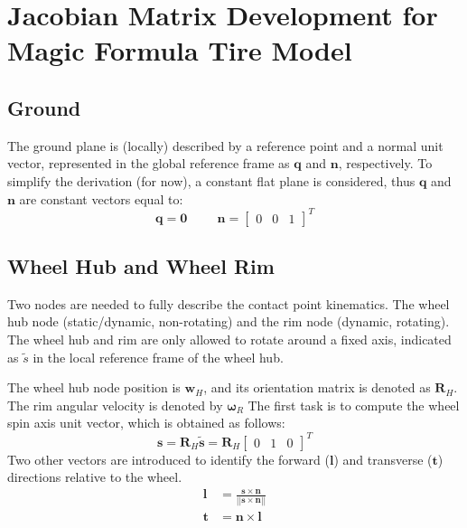 \section{Jacobian Matrix Development for Magic Formula Tire Model}

\subsection{Ground}

The ground plane is (locally) described by a reference point and a normal unit vector, represented in the global reference frame as $\mathbf{q}$ and $\mathbf{n}$, respectively. To simplify the derivation (for now), a constant flat plane is considered, thus $\mathbf{q}$ and $\mathbf{n}$ are constant vectors equal to:
\begin{equation}
    \label{eq:assumptions}
    \mathbf{q} = \mathbf{0}\hspace{1cm}\mathbf{n} = \begin{bmatrix}
        0 & 0 & 1
    \end{bmatrix}^T
\end{equation}

\subsection{Wheel Hub and Wheel Rim}

Two nodes are needed to fully describe the contact point kinematics. The wheel hub node (static/dynamic, non-rotating) and the rim node (dynamic, rotating). The wheel hub and rim are only allowed to rotate around a fixed axis, indicated as $\tilde{s}$ in the local reference frame of the wheel hub.

The wheel hub node position is $\mathbf{w}_H$, and its orientation matrix is denoted as $\mathbf{R}_H$. The rim angular velocity is denoted by $\boldsymbol{\omega}_R$
The first task is to compute the wheel spin axis unit vector, which is obtained as follows:
\begin{equation}
    \mathbf{s} = \mathbf{R}_H \tilde{\mathbf{s}} = \mathbf{R}_H \begin{bmatrix}
        0 & 1 & 0
    \end{bmatrix}^T
\end{equation}
Two other vectors are introduced to identify the forward ($\mathbf{l}$) and transverse ($\mathbf{t}$) directions relative to the wheel.
\begin{equation}
    \begin{split}
        \mathbf{l} &= \frac{\mathbf{s} \times \mathbf{n}}{||\mathbf{s} \times \mathbf{n}||}\\
        \mathbf{t} &= \mathbf{n} \times \mathbf{l}
    \end{split}
\end{equation}

